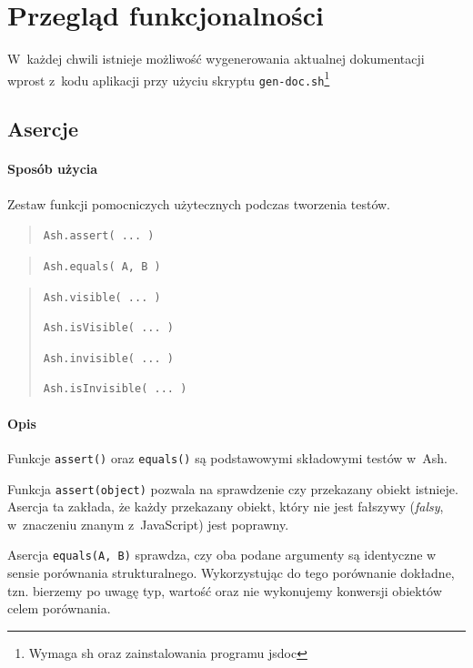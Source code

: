 \documentclass[brudnopis]{xmgr}
\begin{document}
\chapter{Przegląd funkcjonalności}

W~każdej chwili istnieje możliwość wygenerowania aktualnej dokumentacji wprost z~kodu aplikacji przy użyciu skryptu \texttt{gen-doc.sh}\footnote{Wymaga sh oraz zainstalowania programu jsdoc}

\section{Asercje}

\subsubsection{Sposób użycia}

Zestaw funkcji pomocniczych użytecznych podczas tworzenia testów.

\begin{quote}
  \texttt{Ash.assert( ... )} 
\end{quote}

\begin{quote}
  \texttt{Ash.equals( A, B )} 
\end{quote}

\begin{quote}
  \texttt{Ash.visible( ... )} 

  \texttt{Ash.isVisible( ... )}

  \texttt{Ash.invisible( ... )}

  \texttt{Ash.isInvisible( ... )}
\end{quote}

\subsubsection{Opis}

Funkcje \texttt{assert()} oraz \texttt{equals()} są podstawowymi składowymi testów w~Ash.

Funkcja \texttt{assert(object)} pozwala na sprawdzenie czy przekazany obiekt istnieje. Asercja ta zakłada, że każdy przekazany obiekt, który nie jest fałszywy (\textit{falsy}, w~znaczeniu znanym z~JavaScript) jest poprawny. 

Asercja \texttt{equals(A, B)} sprawdza, czy oba podane argumenty są identyczne w sensie porównania strukturalnego. Wykorzystując do tego porównanie dokładne, tzn. bierzemy po uwagę typ, wartość oraz nie wykonujemy konwersji obiektów celem porównania.
\end{document}

